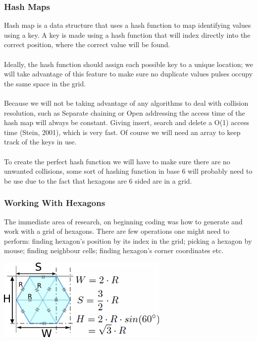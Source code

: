 \documentclass[10pt,a4paper]{article}
\begin{document}
\subsubsection{Hash Maps}
Hash map is a data structure that uses a hash function to map identifying values using a key. A key is made using a hash function that will index directly into the correct position, where the correct value will be found\cite{hashm}.\\
\\
Ideally, the hash function should assign each possible key to a unique location; we will take advantage of this feature to make sure no duplicate values pulses occupy the same space in the grid.\\
\\
Because we will not be taking advantage of any algorithms to deal with collision resolution, such as Separate chaining or Open addressing the access time of the hash map will always be constant. Giving insert, search and delete a O(1) access time (Stein, 2001), which is very fast. Of course we will need an array to keep track of the keys in use.\\
\\
To create the perfect hash function we will have to make sure there are no unwanted collisions, some sort of hashing function in base 6 will probably need to be use due to the fact that hexagons are 6 sided are in a grid. \\

\subsubsection{Working With Hexagons}
The immediate area of research, on beginning coding was how to generate and work with a grid of hexagons. There are few operations one might need to perform: finding hexagon's position by its index in the grid; picking a hexagon by mouse; finding neighbour cells; finding hexagon's corner coordinates etc.\\

\begin{center}
\includegraphics[scale=1]{diag1.png}\\
\end{center}
\end{document}
